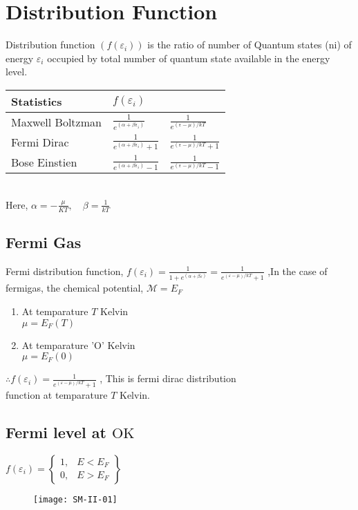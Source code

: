 \section{Distribution Function}
Distribution function $\left(f\left(\varepsilon_{i}\right)\right)$ is the ratio of number of Quantum states (ni) of energy $\varepsilon_{i}$ occupied by total number of quantum state available in the energy level.\\
\renewcommand*{\arraystretch}{2}
\begin{tabular}{|p{3cm}|p{3cm}|p{3cm}|}
	\hline
	Statistics&$f\left(\varepsilon_{i}\right)$& \\\hline
	Maxwell Boltzman&$\frac{1}{e^{\left(\alpha+\beta \varepsilon_{i}\right)}}$& $\frac{1}{e^{(\varepsilon-\mu) / k T}}$\\\hline
	Fermi Dirac&$\frac{1}{e^{\left(\alpha+\beta \varepsilon_{i}\right)}+1}$&$\frac{1}{e^{(\varepsilon-\mu) / k T}+1}$\\\hline
	Bose Einstien &$\frac{1}{e^{\left(\alpha+\beta \varepsilon_{i}\right)}-1}$&$\frac{1}{e^{(\varepsilon-\mu) / k T}-1}$\\\hline
\end{tabular}\\
Here, $\alpha=-\frac{\mu}{K T}, \quad \beta=\frac{1}{k T}$
\subsection{Fermi Gas}
Fermi distribution function, $f\left(\varepsilon_{i}\right)=\frac{1}{1+e^{(\alpha+\beta \varepsilon)}}=\frac{1}{e^{(\varepsilon-\mu) / k T}+1}$ ,In the case of fermigas, the chemical potential, $\mathcal{M}=E_F$
\begin{enumerate}[label=\roman*)]
	\item At temparature $T$ Kelvin\\
	$\mu=E_{F}(T)$
	\item At temparature 'O' Kelvin\\
	$
	\mu=E_{F}(0)
	$
\end{enumerate}
$\therefore f\left(\varepsilon_{i}\right)=\frac{1}{e^{(\varepsilon-\mu) / k T}+1}$ , This is fermi dirac distribution\\
function at temparature $T$ Kelvin.
\subsection{Fermi level at $\mathrm{OK}$}
$f\left(\varepsilon_{i}\right)=\left\{\begin{array}{ll}1, & E<E_{F} \\ 0, & E>E_{F}\end{array}\right\}$
\begin{figure}[H]
	\centering
	\texttt{[image: SM-II-01]}
\end{figure}
